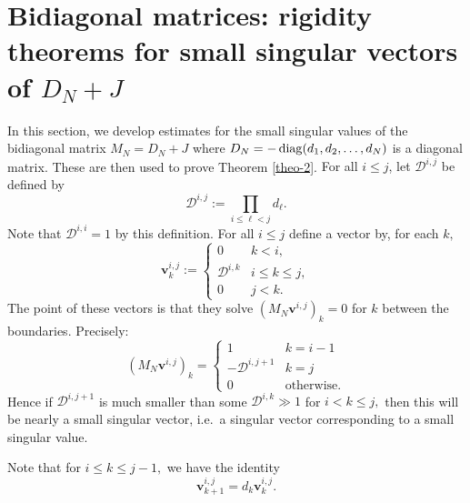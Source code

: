 \documentclass{amsart}
\numberwithin{equation}{section}
\def\corAB{}
\def\corOZ{}
\def\corABrev{\textcolor{black}}
\begin{document}
\section{Bidiagonal matrices: rigidity theorems for small singular vectors of $D_N+J$}
\label{sec-d=1}

In this section, we develop estimates for the small
singular values of the bidiagonal matrix $M_N = D_N+J$
where \corABrev{$D_N=-\operatorname{diag}(d_1,d_2, \dots, d_N)$} is a diagonal matrix. \corOZ{These}
\corAB{are then used to prove Theorem \ref{theo-2}}. \corAB{For all $i \leq j$, let $\mathcal{D}^{i,j}$ be defined by}
\[
  \mathcal{D}^{i,j} := \prod_{i \leq \ell < j} d_\ell.
\]
Note that $\mathcal{D}^{i,i}=1$ by this definition.
For all $i \leq j$ define a vector by, for each $k,$
\begin{equation}\label{eq:vdefine}
  {\bm v}^{i,j}_k
  :=
  \begin{cases}
    0 &   k < i, \\
    \mathcal{D}^{i,k} & i \leq k \leq j, \\
    0 &   j < k.
  \end{cases}
\end{equation}
The point of these vectors is that they solve $(M_N {\bm v}^{i,j})_k = 0$ for $k$ between the boundaries.   Precisely:
\begin{equation}
  (M_N {\bm v}^{i,j})_k
  = \begin{cases}
    1 & k = i-1 \\
    -\mathcal{D}^{i,j+1} & k = j \\
    0 & \text{otherwise}.
  \end{cases}
  \label{eq:MNv}
\end{equation}
Hence if $\mathcal{D}^{i,j+1}$ is much smaller than some $\mathcal{D}^{i,k} \gg 1$ for $i < k \leq j,$  then this will be nearly a small singular vector, \corAB{i.e.~a singular vector corresponding to a small singular value}.

Note that for $i \leq k \leq j-1,$ we have the identity
\begin{equation}
  \label{eq:iteration}
  {\bm v}^{i,j}_{k+1}
  = d_k
  {\bm v}^{i,j}_{k}.
\end{equation}
\end{document}
